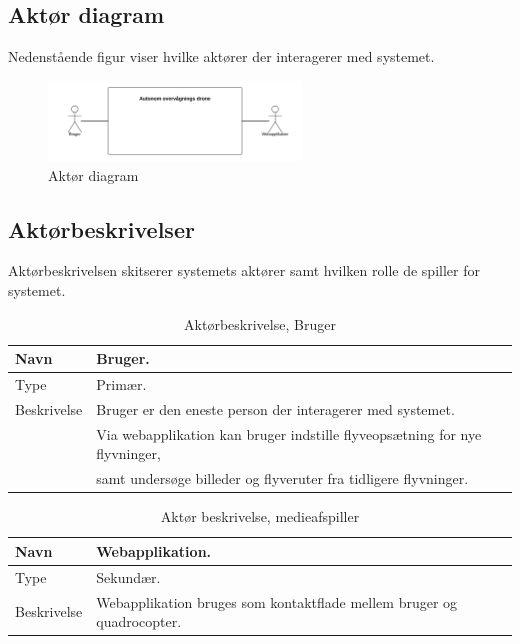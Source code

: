 \subsection{Aktør diagram}
Nedenstående figur viser hvilke aktører der interagerer med systemet.

\begin{figure}[H]
\centering
\includegraphics[width=0.6\textwidth]{Billeder/Aktor_diagram.png}
\caption{Aktør diagram}
\label{fig:ATD}
\end{figure}

\subsection{Aktørbeskrivelser}
Aktørbeskrivelsen skitserer systemets aktører samt hvilken rolle de spiller for systemet.


\begin{table}[H]
\begin{tabular}{|l|p{13.25cm}|} \hline

Navn					& Bruger. 	\\\hline
Type					& Primær.	\\\hline
Beskrivelse				& Bruger er den eneste person der interagerer med systemet.\\
						& Via webapplikation kan bruger indstille flyveopsætning for nye flyvninger, \\ 
						& samt undersøge billeder og flyveruter fra tidligere flyvninger.\\\hline
						
\end{tabular}
\caption{Aktørbeskrivelse, Bruger}
\label{tab:AB1}
\end{table}


\begin{table}[H]
\begin{tabular}{|l|p{13.25cm}|}
\hline
Navn					& Webapplikation. 	\\\hline
Type					& Sekundær.	\\\hline
Beskrivelse				& Webapplikation bruges som kontaktflade mellem bruger og quadrocopter.\\\hline

\end{tabular}
\caption{Aktør beskrivelse, medieafspiller}
\label{tab:AB2}
\end{table}